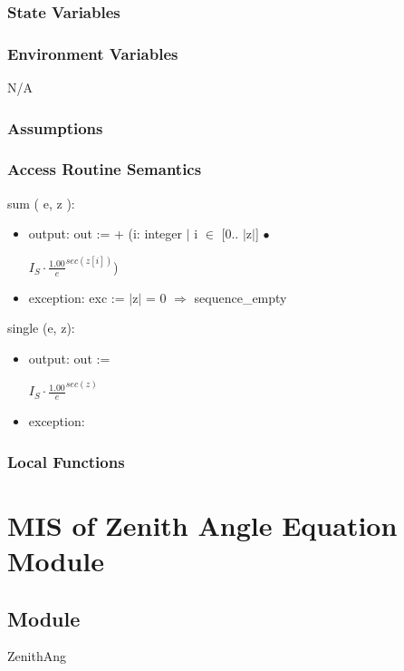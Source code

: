 \documentclass[12pt, titlepage]{article}
\begin{document}
\subsubsection{State Variables}


\subsubsection{Environment Variables}

N/A

\subsubsection{Assumptions}

\subsubsection{ Access Routine Semantics}

\noindent sum ( e, z ):
\begin{itemize}
\item output: out := + (i: integer $|$ i $\in$ [0.. $|$z$|$] $\bullet$ 
\begin{center}\large
$I_{S} \cdot \frac{1.00}{e}^{sec(z [ i ])} $)
\end{center}
\item exception: exc := $|$z$|$ = 0 $\Rightarrow$ sequence\_empty
\end{itemize}

\noindent single (e, z):
\begin{itemize}
\item output: out := 
\begin{center}\large
$I_{S} \cdot \frac{1.00}{e}^{sec(z)} $
\end{center}
\item exception: 
\end{itemize}

\subsubsection{Local Functions}


\section{MIS of Zenith Angle Equation Module} \label{ModuleZA} 

\subsection{Module}
ZenithAng
\end{document}
